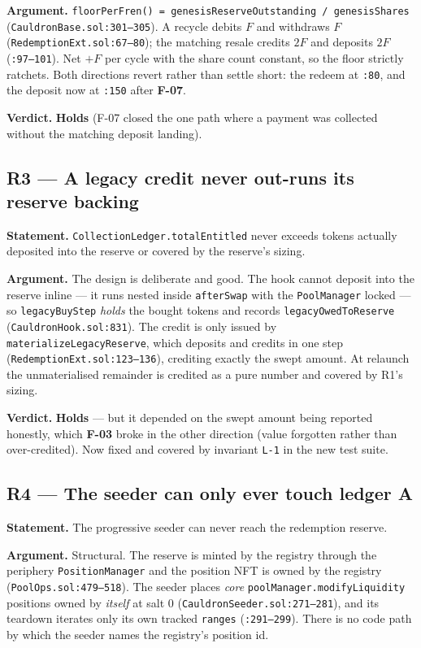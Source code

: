 \documentclass[11pt,a4paper]{article}
\newcommand{\code}[1]{\texttt{\small #1}}
\newcommand{\fileref}[1]{\texttt{\scriptsize #1}}
\begin{document}
\textbf{Argument.} \code{floorPerFren() = genesisReserveOutstanding / genesisShares}
(\fileref{CauldronBase.sol:301--305}). A recycle debits $F$ and withdraws $F$
(\fileref{RedemptionExt.sol:67--80}); the matching resale credits $2F$ and
deposits $2F$ (\fileref{:97--101}). Net $+F$ per cycle with the share count
constant, so the floor strictly ratchets. Both directions revert rather than
settle short: the redeem at \fileref{:80}, and the deposit now at \fileref{:150}
after \textbf{F-07}.

\textbf{Verdict.} \textcolor{good}{\textbf{Holds}} (F-07 closed the one path where
a payment was collected without the matching deposit landing).

\subsection*{R3 --- A legacy credit never out-runs its reserve backing}
\textbf{Statement.} \code{CollectionLedger.totalEntitled} never exceeds tokens
actually deposited into the reserve or covered by the reserve's sizing.

\textbf{Argument.} The design is deliberate and good. The hook cannot deposit into
the reserve inline --- it runs nested inside \code{afterSwap} with the
\code{PoolManager} locked --- so \code{legacyBuyStep} \emph{holds} the bought
tokens and records \code{legacyOwedToReserve} (\fileref{CauldronHook.sol:831}). The
credit is only issued by \code{materializeLegacyReserve}, which deposits and
credits in one step (\fileref{RedemptionExt.sol:123--136}), crediting exactly the
swept amount. At relaunch the unmaterialised remainder is credited as a pure
number and covered by R1's sizing.

\textbf{Verdict.} \textcolor{good}{\textbf{Holds}} --- but it depended on the swept
amount being reported honestly, which \textbf{F-03} broke in the other direction
(value forgotten rather than over-credited). Now fixed and covered by invariant
\code{L-1} in the new test suite.

\subsection*{R4 --- The seeder can only ever touch ledger A}
\textbf{Statement.} The progressive seeder can never reach the redemption reserve.

\textbf{Argument.} Structural. The reserve is minted by the registry through the
periphery \code{PositionManager} and the position NFT is owned by the registry
(\fileref{PoolOps.sol:479--518}). The seeder places \emph{core}
\code{poolManager.modifyLiquidity} positions owned by \emph{itself} at salt 0
(\fileref{CauldronSeeder.sol:271--281}), and its teardown iterates only its own
tracked \code{ranges} (\fileref{:291--299}). There is no code path by which the
seeder names the registry's position id.
\end{document}

